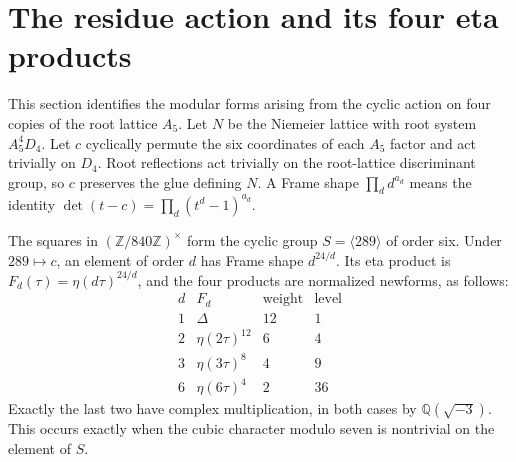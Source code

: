 \section{The residue action and its four eta products}
This section identifies the modular forms arising from the cyclic action on
four copies of the root lattice $A_5$.
Let $N$ be the Niemeier lattice with root system $A_5^4D_4$.
Let $c$ cyclically permute the six coordinates of each $A_5$ factor and
act trivially on $D_4$.  Root reflections act trivially on the
root-lattice discriminant group, so $c$ preserves the glue defining $N$.
A Frame shape $\prod_d d^{a_d}$ means the identity
$\det(t-c)=\prod_d(t^d-1)^{a_d}$.

\begin{theorem}\label{thm:residue-eta}
The squares in $(\mathbb Z/840\mathbb Z)^\times$ form the cyclic group
$S=\langle289\rangle$ of order six. Under $289\mapsto c$, an element
of order $d$ has Frame shape $d^{24/d}$. Its eta product is
$F_d(\tau)=\eta(d\tau)^{24/d}$, and the four products are normalized
newforms, as follows:
\[
\begin{array}{c|c|c|c}
 d&F_d&\text{weight}&\text{level}\\\hline
 1&\Delta&12&1\\
 2&\eta(2\tau)^{12}&6&4\\
 3&\eta(3\tau)^8&4&9\\
 6&\eta(6\tau)^4&2&36
\end{array}
\]
Exactly the last two have complex multiplication, in both cases by
$\mathbb Q(\sqrt{-3})$. This occurs exactly when the cubic character
modulo seven is nontrivial on the element of $S$.
\end{theorem}
